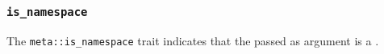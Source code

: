 
\subsubsection{\texttt{is\_namespace}}

The \texttt{meta::is\_namespace}
trait indicates that the  passed as argument is a .


